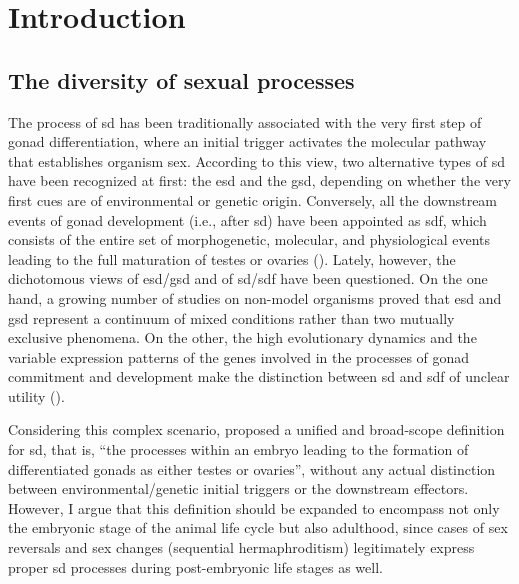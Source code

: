 
% 

{
\chapter{Introduction}
\label{introduction}
}

\section{The diversity of sexual processes}
The process of \gls{sd} has been traditionally associated with the very first step of gonad differentiation, where an initial trigger activates the molecular pathway that establishes organism sex. According to this view, two alternative types of \gls{sd} have been recognized at first: the \gls{esd} and the \gls{gsd}, depending on whether the very first cues are of environmental or genetic origin. Conversely, all the downstream events of gonad development (i.e., after \gls{sd}) have been appointed as \gls{sdf}, which consists of the entire set of morphogenetic, molecular, and physiological events leading to the full maturation of testes or ovaries (\textbf{\cite{uller2011origin, beukeboom2014evolution}}). Lately, however, the dichotomous views of \gls{esd}/\gls{gsd} and of \gls{sd}/\gls{sdf} have been questioned. On the one hand, a growing number of studies on non-model organisms proved that \gls{esd} and \gls{gsd} represent a continuum of mixed conditions rather than two mutually exclusive phenomena. On the other, the high evolutionary dynamics and the variable expression patterns of the genes involved in the processes of gonad commitment and development make the distinction between \gls{sd} and \gls{sdf} of unclear utility (\textbf{\cite{beukeboom2014evolution}}).

Considering this complex scenario, \textbf{\cite{uller2011origin}} proposed a unified and broad-scope definition for \gls{sd}, that is, “the processes within an embryo leading to the formation of differentiated gonads as either testes or ovaries”, without any actual distinction between environmental/genetic initial triggers or the downstream effectors. However, I argue that this definition should be expanded to encompass not only the embryonic stage of the animal life cycle but also adulthood, since cases of sex reversals and sex changes (sequential hermaphroditism) legitimately express proper \gls{sd} processes during post-embryonic life stages as well.

